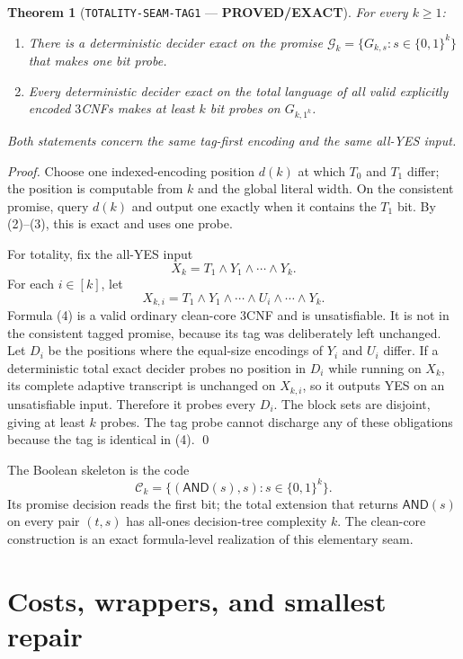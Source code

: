 \documentclass[11pt]{article}
\newcommand{\AND}{\mathsf{AND}}
\newcommand{\EXACT}{\textbf{PROVED/EXACT}}
\newtheorem{theorem}{Theorem}
\begin{document}
\begin{theorem}[\texttt{TOTALITY-SEAM-TAG1} --- \EXACT]
For every $k\ge1$:
\begin{enumerate}[leftmargin=1.6em]
\item There is a deterministic decider exact on the promise
$\mathcal G_k=\{G_{k,s}:s\in\{0,1\}^k\}$ that makes one bit probe.
\item Every deterministic decider exact on the total language of all valid
explicitly encoded $3$CNFs makes at least $k$ bit probes on $G_{k,1^k}$.
\end{enumerate}
Both statements concern the same tag-first encoding and the same all-YES
input.
\end{theorem}

\begin{proof}
Choose one indexed-encoding position $d(k)$ at which $T_0$ and $T_1$ differ;
the position is computable from $k$ and the global literal width.  On the
consistent promise, query $d(k)$ and output one exactly when it contains the
$T_1$ bit.  By (2)--(3), this is exact and uses one probe.

For totality, fix the all-YES input
\[
 X_k=T_1\wedge Y_1\wedge\cdots\wedge Y_k.
\]
For each $i\in[k]$, let
\[
 X_{k,i}=T_1\wedge Y_1\wedge\cdots\wedge U_i
              \wedge\cdots\wedge Y_k.             \tag{4}
\]
Formula (4) is a valid ordinary clean-core $3$CNF and is unsatisfiable.  It is
not in the consistent tagged promise, because its tag was deliberately left
unchanged.  Let $D_i$ be the positions where the equal-size encodings of
$Y_i$ and $U_i$ differ.  If a deterministic total exact decider probes no
position in $D_i$ while running on $X_k$, its complete adaptive transcript is
unchanged on $X_{k,i}$, so it outputs YES on an unsatisfiable input.  Therefore
it probes every $D_i$.  The block sets are disjoint, giving at least $k$
probes.  The tag probe cannot discharge any of these obligations because the
tag is identical in (4).  \qed
\end{proof}

The Boolean skeleton is the code
\[
 \mathcal C_k=\{(\AND(s),s):s\in\{0,1\}^k\}.
\]
Its promise decision reads the first bit; the total extension that returns
$\AND(s)$ on every pair $(t,s)$ has all-ones decision-tree complexity $k$.
The clean-core construction is an exact formula-level realization of this
elementary seam.

\section{Costs, wrappers, and smallest repair}
\end{document}
